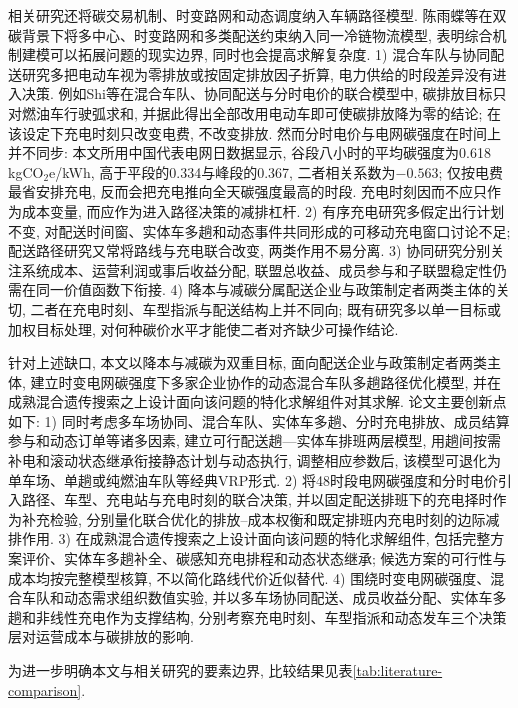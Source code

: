 \documentclass{setp-new}
\begin{document}
相关研究还将碳交易机制、时变路网和动态调度纳入车辆路径模型.
陈雨蝶等\cite{ref:48}在双碳背景下将多中心、时变路网和多类配送约束纳入同一冷链物流模型,
表明综合机制建模可以拓展问题的现实边界, 同时也会提高求解复杂度.
1) 混合车队与协同配送研究多把电动车视为零排放或按固定排放因子折算,
电力供给的时段差异没有进入决策.
例如Shi等\cite{ref:93}在混合车队、协同配送与分时电价的联合模型中,
碳排放目标只对燃油车行驶弧求和, 并据此得出全部改用电动车即可使碳排放降为零的结论;
在该设定下充电时刻只改变电费, 不改变排放.
然而分时电价与电网碳强度在时间上并不同步:
本文所用中国代表电网日数据显示, 谷段八小时的平均碳强度为0.618\,kgCO$_2$e/kWh,
高于平段的0.334与峰段的0.367, 二者相关系数为$-0.563$;
仅按电费最省安排充电, 反而会把充电推向全天碳强度最高的时段.
充电时刻因而不应只作为成本变量, 而应作为进入路径决策的减排杠杆.
2) 有序充电研究多假定出行计划不变,
对配送时间窗、实体车多趟和动态事件共同形成的可移动充电窗口讨论不足;
配送路径研究又常将路线与充电联合改变, 两类作用不易分离.
3) 协同研究分别关注系统成本、运营利润或事后收益分配,
联盟总收益、成员参与和子联盟稳定性仍需在同一价值函数下衔接.
4) 降本与减碳分属配送企业与政策制定者两类主体的关切,
二者在充电时刻、车型指派与配送结构上并不同向;
既有研究多以单一目标或加权目标处理, 对何种碳价水平才能使二者对齐缺少可操作结论.

针对上述缺口, 本文以降本与减碳为双重目标, 面向配送企业与政策制定者两类主体,
建立时变电网碳强度下多家企业协作的动态混合车队多趟路径优化模型,
并在成熟混合遗传搜索之上设计面向该问题的特化求解组件对其求解.
论文主要创新点如下:
1) 同时考虑多车场协同、混合车队、实体车多趟、分时充电排放、成员结算参与和动态订单等诸多因素,
建立可行配送趟—实体车排班两层模型,
用趟间按需补电和滚动状态继承衔接静态计划与动态执行,
调整相应参数后, 该模型可退化为单车场、单趟或纯燃油车队等经典VRP形式.
2) 将48时段电网碳强度和分时电价引入路径、车型、充电站与充电时刻的联合决策,
并以固定配送排班下的充电择时作为补充检验,
分别量化联合优化的排放--成本权衡和既定排班内充电时刻的边际减排作用.
3) 在成熟混合遗传搜索之上设计面向该问题的特化求解组件,
包括完整方案评价、实体车多趟补全、碳感知充电排程和动态状态继承;
候选方案的可行性与成本均按完整模型核算, 不以简化路线代价近似替代.
4) 围绕时变电网碳强度、混合车队和动态需求组织数值实验,
并以多车场协同配送、成员收益分配、实体车多趟和非线性充电作为支撑结构,
分别考察充电时刻、车型指派和动态发车三个决策层对运营成本与碳排放的影响.

为进一步明确本文与相关研究的要素边界, 比较结果见表\ref{tab:literature-comparison}.
\end{document}

